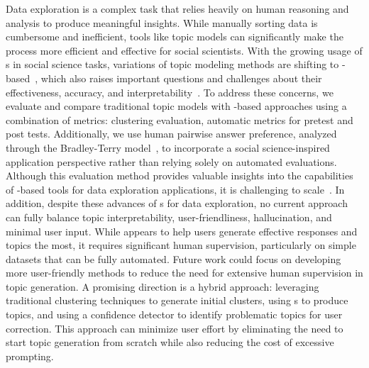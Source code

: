 Data exploration is a complex task that relies heavily on human reasoning and analysis to produce meaningful insights. 
%
While manually sorting data is cumbersome and inefficient, tools like topic models can significantly make the process more efficient and effective for social scientists.
%
With the growing usage of \mm{}s in social science tasks, variations of topic modeling methods are shifting to \mm{}-based~\cite{pham2024topicgpt, lam2024concept}, which also raises important questions and challenges about their effectiveness, accuracy, and interpretability~\cite{li-etal-2024-pedants, li2025benchmarkevaluationsapplicationschallenges, hoyle2021automated,doogan-buntine-2021-topic, mondal2024scidoc2diagrammermafgenerationscientificdiagrams}.
%
To address these concerns, we evaluate and compare traditional topic models with \mm{}-based approaches using a combination of metrics: clustering evaluation, automatic metrics for pretest and post tests. 
%
Additionally, we use human pairwise answer preference, analyzed through the Bradley-Terry model~\cite{Bradley1952RankAO}, to incorporate a social science-inspired application perspective rather than relying solely on automated evaluations. 
%
Although this evaluation method provides valuable insights into the capabilities of \mm{}-based tools for data exploration applications, it is challenging to scale~\cite{zhou2024multi}.
%
In addition, despite these advances of \mm{}s for data exploration, no current approach can fully balance topic interpretability, user-friendliness, hallucination, and minimal user input. 
%
While \bass{} appears to help users generate effective responses and topics the most, it requires significant human supervision, particularly on simple datasets that can be fully automated.
%
Future work could focus on developing more user-friendly methods to reduce the need for extensive human supervision in topic generation. 
%
A promising direction is a hybrid approach: leveraging traditional clustering techniques to generate initial clusters, using \mm{}s to produce topics, and using a confidence detector to identify problematic topics for user correction. 
%
This approach can minimize user effort by eliminating the need to start topic generation from scratch while also reducing the cost of excessive \mm{} prompting.
